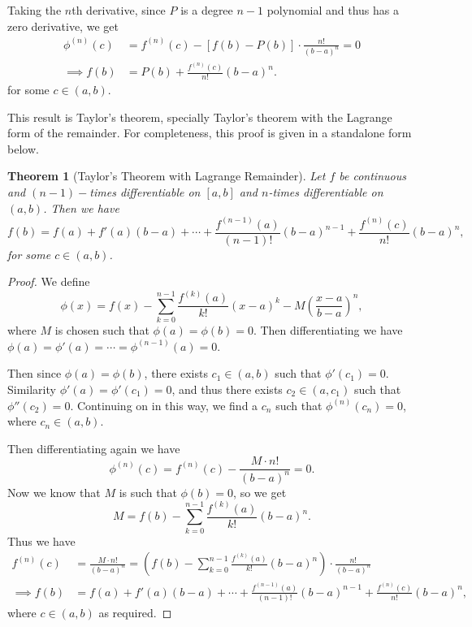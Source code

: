 \documentclass[11pt, a4paper]{article}
\newtheorem{theorem}{Theorem}[section]
\theoremstyle{definition}
\begin{document}
Taking the $n$th derivative, since $P$ is a degree $n - 1$ polynomial and thus has a zero derivative, we get
\begin{align*}
	\phi^{(n)}(c) &= f^{(n)}(c) - [f(b) - P(b)] \cdot \frac{n!}{(b - a)^n} = 0 \\
\implies f(b)  &= P(b) + \frac{f^{(n)}(c)}{n!}(b - a)^n.
\end{align*}
for some $c \in (a, b)$. 

This result is Taylor's theorem, specially Taylor's theorem with the Lagrange form of the remainder. For completeness, this proof is given in a standalone form below.

\begin{theorem}[Taylor's Theorem with Lagrange Remainder]
	Let $f$ be continuous and $(n - 1)-$times differentiable on $[a, b]$ and $n$-times differentiable on $(a, b)$. Then we have
	$$
	f(b) = f(a) + f'(a)(b - a) + \cdots + \frac{f^{(n - 1)}(a)}{(n - 1)!}(b - a)^{n - 1} + \frac{f^{(n)}(c)}{n!}(b - a)^n,
	$$
	for some $c \in (a, b)$.
\end{theorem}
\begin{proof}
	We define
	$$
	\phi(x) = f(x) - \sum_{k = 0}^{n - 1} \frac{f^{(k)}(a)}{k!}(x - a)^k - M \left(\frac{x - a}{b - a}\right)^n,
	$$
	where $M$ is chosen such that $\phi(a) = \phi(b) = 0$.
	Then differentiating we have $\phi(a) = \phi'(a) = \cdots = \phi^{(n - 1)}(a) = 0$. 

	Then since $\phi(a) = \phi(b)$, there exists $c_1 \in (a, b)$ such that $\phi'(c_1) = 0$. Similarity $\phi'(a) = \phi'(c_1) = 0$, and thus there exists $c_2 \in (a, c_1)$ such that $\phi''(c_2) = 0$. Continuing on in this way, we find a $c_{n}$ such that $\phi^{(n)}(c_n) = 0$, where $c_n \in (a, b)$. 

	Then differentiating again we have
	$$
	\phi^{(n)}(c) = f^{(n)}(c) - \frac{M \cdot n!}{(b - a)^n} = 0.
	$$
	Now we know that $M$ is such that $\phi(b) = 0$, so we get
	$$
	M = f(b) - \sum_{k = 0}^{n - 1}\frac{f^{(k)}(a)}{k!} (b - a)^n.
	$$
	Thus we have
	\begin{align*}
		f^{(n)}(c) &= \frac{M \cdot n!}{(b - a)^n} = \left(f(b) - \sum_{k = 0}^{n - 1}\frac{f^{(k)}(a)}{k!} (b - a)^n\right) \cdot \frac{n!}{(b - a)^n} \\
\implies f(b) &= f(a) + f'(a)(b - a) + \cdots + \frac{f^{(n - 1)}(a)}{(n - 1)!}(b - a)^{n - 1} + \frac{f^{(n)}(c)}{n!}(b - a)^n,
	\end{align*}
	where $c \in (a, b)$ as required.
\end{proof}
\end{document}
